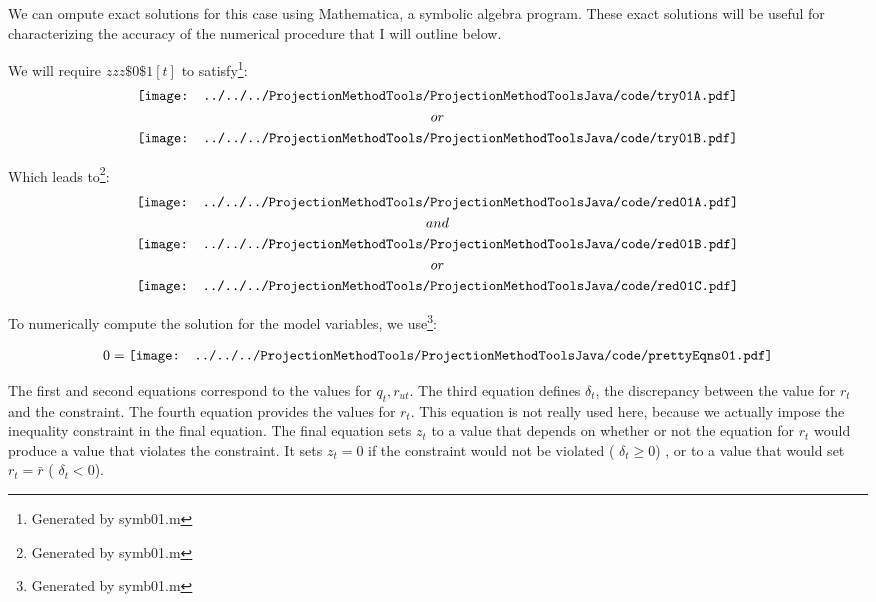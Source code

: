 We can ompute exact solutions for this case using
Mathematica, a symbolic algebra program.  These exact 
solutions will be useful for
characterizing the accuracy of the numerical procedure that I will outline
below.

We will require $zzz\$0\$1[t]$ to satisfy\footnote{Generated by symb01.m}:
 \begin{gather*}
\vcenter{\hbox{\texttt{[image: ../../../ProjectionMethodTools/ProjectionMethodToolsJava/code/try01A.pdf]}}}\\
or\\
\vcenter{\hbox{\texttt{[image: ../../../ProjectionMethodTools/ProjectionMethodToolsJava/code/try01B.pdf]}}}\\
 \end{gather*}


Which leads to\footnote{Generated by symb01.m}:
 \begin{gather*}
\vcenter{\hbox{\texttt{[image: ../../../ProjectionMethodTools/ProjectionMethodToolsJava/code/red01A.pdf]}}}\\
and\\
\vcenter{\hbox{\texttt{[image: ../../../ProjectionMethodTools/ProjectionMethodToolsJava/code/red01B.pdf]}}}\\
or\\
\vcenter{\hbox{\texttt{[image: ../../../ProjectionMethodTools/ProjectionMethodToolsJava/code/red01C.pdf]}}}
 \end{gather*}



To numerically compute the solution for the model variables, we use\footnote{Generated by symb01.m}:

\begin{gather*}
  0=\vcenter{\hbox{\texttt{[image: ../../../ProjectionMethodTools/ProjectionMethodToolsJava/code/prettyEqns01.pdf]}}}
\end{gather*}

The first and second equations correspond to the values for $q_t,r_{ut}$.
The third equation defines $\delta_t$, the discrepancy between the value for $r_t$ and the constraint.    The fourth equation provides the values for $r_t$.  This equation is not really used here, because we actually impose the inequality
constraint in the final equation. The final equation
 sets $z_t$ to a value that depends on 
whether or not the equation for $r_t$ would produce a value that violates the
constraint.  It sets $z_t=0$ if the constraint would  not be violated ( $\delta_t\ge0$) ,  or
to a value that would set $r_t=\bar{r}$ ( $\delta_t<0$).


